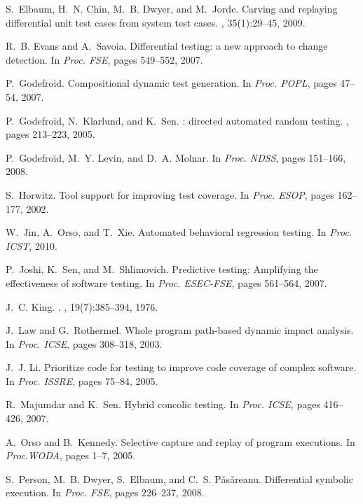 \documentclass{llncs}
\begin{document}
{\begin{thebibliography}{10}
\begin{scriptsize}
S.~Elbaum, H.~N. Chin, M.~B. Dwyer, and M.~Jorde.
\newblock Carving and replaying differential unit test cases from system test
  cases.
, 35(1):29--45, 2009.

R.~B. Evans and A.~Savoia.
\newblock Differential testing: a new approach to change detection.
\newblock In {\em Proc. FSE}, pages 549--552, 2007.

P.~Godefroid.
\newblock Compositional dynamic test generation.
\newblock In {\em Proc. POPL}, pages 47--54, 2007.

P.~Godefroid, N.~Klarlund, and K.~Sen.
: directed automated random testing.
, pages 213--223, 2005.

P.~Godefroid, M.~Y. Levin, and D.~A. Molnar.
\newblock In {\em Proc. NDSS}, pages 151--166, 2008.

S.~Horwitz.
\newblock Tool support for improving test coverage.
\newblock In {\em Proc. ESOP}, pages 162--177, 2002.

W.~Jin, A.~Orso, and T.~Xie.
\newblock Automated behavioral regression testing.
\newblock In {\em Proc. ICST}, 2010.

P.~Joshi, K.~Sen, and M.~Shlimovich.
\newblock Predictive testing: Amplifying the effectiveness of software testing.
\newblock In {\em Proc. ESEC-FSE}, pages 561--564, 2007.

J.~C. King.
.
, 19(7):385--394, 1976.

J.~Law and G.~Rothermel.
\newblock Whole program path-based dynamic impact analysis.
\newblock In {\em Proc. ICSE}, pages 308--318, 2003.

J.~J. Li.
\newblock Prioritize code for testing to improve code coverage of complex
  software.
\newblock In {\em Proc. ISSRE}, pages 75--84, 2005.

R.~Majumdar and K.~Sen.
\newblock Hybrid concolic testing.
\newblock In {\em Proc. ICSE}, pages 416--426, 2007.

A.~Orso and B.~Kennedy.
\newblock Selective capture and replay of program executions.
\newblock In {\em Proc.WODA}, pages 1--7, 2005.

S.~Person, M.~B. Dwyer, S.~Elbaum, and C.~S. P\v{a}s\v{a}reanu.
\newblock Differential symbolic execution.
\newblock In {\em Proc. FSE}, pages 226--237, 2008.


\end{scriptsize}
\end{thebibliography}}
\end{document}
